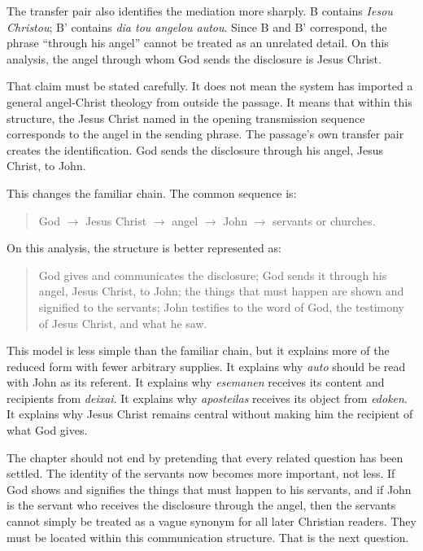 The transfer pair also identifies the mediation more sharply. B contains \textit{Iesou Christou}; B' contains \textit{dia tou angelou autou}. Since B and B' correspond, the phrase ``through his angel'' cannot be treated as an unrelated detail. On this analysis, the angel through whom God sends the disclosure is Jesus Christ.

That claim must be stated carefully. It does not mean the system has imported a general angel-Christ theology from outside the passage. It means that within this structure, the Jesus Christ named in the opening transmission sequence corresponds to the angel in the sending phrase. The passage's own transfer pair creates the identification. God sends the disclosure through his angel, Jesus Christ, to John.

This changes the familiar chain. The common sequence is:

\begin{quote}
God $\rightarrow$ Jesus Christ $\rightarrow$ angel $\rightarrow$ John $\rightarrow$ servants or churches.
\end{quote}

On this analysis, the structure is better represented as:

\begin{quote}
God gives and communicates the disclosure; God sends it through his angel, Jesus Christ, to John; the things that must happen are shown and signified to the servants; John testifies to the word of God, the testimony of Jesus Christ, and what he saw.
\end{quote}

This model is less simple than the familiar chain, but it explains more of the reduced form with fewer arbitrary supplies. It explains why \textit{auto} should be read with John as its referent. It explains why \textit{esemanen} receives its content and recipients from \textit{deixai}. It explains why \textit{aposteilas} receives its object from \textit{edoken}. It explains why Jesus Christ remains central without making him the recipient of what God gives.

The chapter should not end by pretending that every related question has been settled. The identity of the servants now becomes more important, not less. If God shows and signifies the things that must happen to his servants, and if John is the servant who receives the disclosure through the angel, then the servants cannot simply be treated as a vague synonym for all later Christian readers. They must be located within this communication structure. That is the next question.
